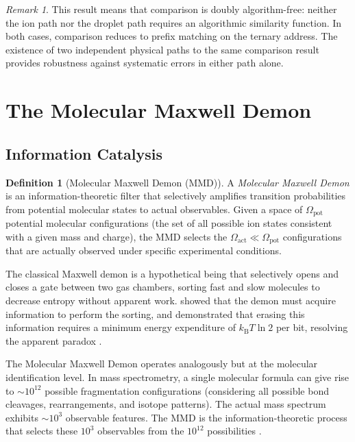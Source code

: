 \documentclass[11pt,twocolumn,a4paper]{article}
\theoremstyle{definition}
\newtheorem{definition}[theorem]{Definition}
\theoremstyle{remark}
\newtheorem{remark}[theorem]{Remark}
\newcommand{\kB}{k_{\mathrm{B}}}
\begin{document}
\begin{remark}
This result means that comparison is doubly algorithm-free: neither the ion path nor the droplet path requires an algorithmic similarity function. In both cases, comparison reduces to prefix matching on the ternary address. The existence of two independent physical paths to the same comparison result provides robustness against systematic errors in either path alone.
\end{remark}

\section{The Molecular Maxwell Demon}\label{sec:mmd}

\subsection{Information Catalysis}\label{sec:info-catalysis}

\begin{definition}[Molecular Maxwell Demon (MMD)]\label{def:mmd}
A \emph{Molecular Maxwell Demon} is an information-theoretic filter that selectively amplifies transition probabilities from potential molecular states to actual observables. Given a space of $\Omega_{\mathrm{pot}}$ potential molecular configurations (the set of all possible ion states consistent with a given mass and charge), the MMD selects the $\Omega_{\mathrm{act}} \ll \Omega_{\mathrm{pot}}$ configurations that are actually observed under specific experimental conditions.
\end{definition}

The classical Maxwell demon \citep{maxwell1871} is a hypothetical being that selectively opens and closes a gate between two gas chambers, sorting fast and slow molecules to decrease entropy without apparent work. \citet{szilard1929} showed that the demon must acquire information to perform the sorting, and \citet{landauer1961} demonstrated that erasing this information requires a minimum energy expenditure of $\kB T \ln 2$ per bit, resolving the apparent paradox \citep{brillouin1951,bennett1982,zurek2003}.

The Molecular Maxwell Demon operates analogously but at the molecular identification level. In mass spectrometry, a single molecular formula can give rise to $\sim$$10^{12}$ possible fragmentation configurations (considering all possible bond cleavages, rearrangements, and isotope patterns). The actual mass spectrum exhibits $\sim$$10^3$ observable features. The MMD is the information-theoretic process that selects these $10^3$ observables from the $10^{12}$ possibilities \citep{mizraji2021biological}.
\end{document}
